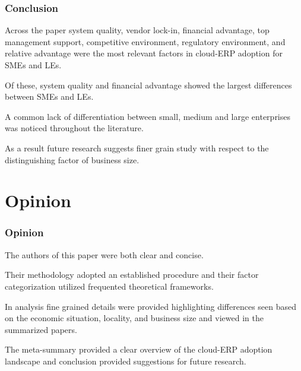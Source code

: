 \documentclass{beamer}
\begin{document}
\begin{frame}

    \frametitle{Conclusion}

    Across the paper system quality, vendor lock-in, financial advantage, top management support, competitive environment, regulatory environment, and relative advantage were the most relevant factors in cloud-ERP adoption for SMEs and LEs. \pause

    \vspace{5mm}
    Of these, system quality and financial advantage showed the largest differences between SMEs and LEs. \pause

    \vspace{5mm}
    A common lack of differentiation between small, medium and large enterprises was noticed throughout the literature. \pause
    
    \vspace{5mm}
    As a result future research suggests finer grain study with respect to the distinguishing factor of business size. 

\end{frame}


\section{Opinion}

\begin{frame}

    \frametitle{Opinion}

    The authors of this paper were both clear and concise. \pause

    \vspace{5mm}
    Their methodology adopted an established procedure and their factor categorization utilized frequented theoretical frameworks. \pause

    \vspace{5mm}
    In analysis fine grained details were provided highlighting differences seen based on the economic situation, locality, and business size and viewed in the summarized papers. \pause

    \vspace{5mm}
    The meta-summary provided a clear overview of the cloud-ERP adoption landscape and conclusion provided suggestions for future research. 

\end{frame}
\end{document}
